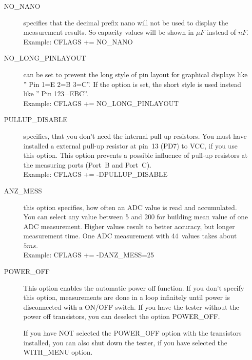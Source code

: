\begin{description}
  \item[NO\_NANO] specifies that the decimal prefix nano will not be used to display the measurement results.
So capacity values will be shown in \(\mu F\) instead of \(nF\).\\
Example: CFLAGS += NO\_NANO

  \item[NO\_LONG\_PINLAYOUT] can be set to prevent the long style of pin layout for graphical displays 
 like '' Pin  1=E 2=B 3=C''.
If the option is set, the short style is used instead like '' Pin  123=EBC''.\\
Example: CFLAGS += NO\_LONG\_PINLAYOUT

\item[PULLUP\_DISABLE] specifies, that you don't need the internal pull-up resistors.
 You must have installed a external pull-up resistor at pin~13 (PD7) to VCC, if you use this option.
This option prevents a possible influence of pull-up resistors at the measuring ports (Port~B and Port~C).\\
Example: CFLAGS += -DPULLUP\_DISABLE

  \item[ANZ\_MESS] this option specifies, how often an ADC value is read and accumulated.
You can select any value between 5 and 200 for building mean value of one ADC measurement.
Higher values result to better accuracy, but  longer measurement time.
One ADC measurement with 44~values takes about \(5ms\).\\
Example: CFLAGS += -DANZ\_MESS=25

  \item[POWER\_OFF] This option enables the automatic power off function. If you don't specify this option,
 measurements are done in a loop infinitely  until power is disconnected with a ON/OFF switch.
If you have the tester without the power off transistors, you can deselect the option POWER\_OFF.

If you have NOT selected the POWER\_OFF option with the transistors installed,
you can also shut down the tester, if you have selected the WITH\_MENU option.


\end{description}
